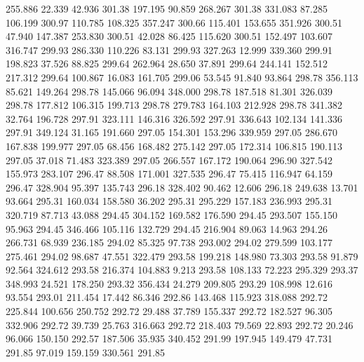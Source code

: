  255.886   22.339   42.936       301.38
 197.195   90.859  268.267       301.38
 331.083   87.285  106.199       300.97
 110.785  108.325  357.247       300.66
 115.401  153.655  351.926       300.51
  47.940  147.387  253.830       300.51
  42.028   86.425  115.620       300.51
 152.497  103.607  316.747       299.93
 286.330  110.226   83.131       299.93
 327.263   12.999  339.360       299.91
 198.823   37.526   88.825       299.64
 262.964   28.650   37.891       299.64
 244.141  152.512  217.312       299.64
 100.867   16.083  161.705       299.06
  53.545   91.840   93.864       298.78
 356.113   85.621  149.264       298.78
 145.066   96.094  348.000       298.78
 187.518   81.301  326.039       298.78
 177.812  106.315  199.713       298.78
 279.783  164.103  212.928       298.78
 341.382   32.764  196.728       297.91
 323.111  146.316  326.592       297.91
 336.643  102.134  141.336       297.91
 349.124   31.165  191.660       297.05
 154.301  153.296  339.959       297.05
 286.670  167.838  199.977       297.05
  68.456  168.482  275.142       297.05
 172.314  106.815  190.113       297.05
  37.018   71.483  323.389       297.05
 266.557  167.172  190.064       296.90
 327.542  155.973  283.107       296.47
  88.508  171.001  327.535       296.47
  75.415  116.947   64.159       296.47
 328.904   95.397  135.743       296.18
 328.402   90.462   12.606       296.18
 249.638   13.701   93.664       295.31
 160.034  158.580   36.202       295.31
 295.229  157.183  236.993       295.31
 320.719   87.713   43.088       294.45
 304.152  169.582  176.590       294.45
 293.507  155.150   95.963       294.45
 346.466  105.116  132.729       294.45
 216.904   89.063   14.963       294.26
 266.731   68.939  236.185       294.02
  85.325   97.738  293.002       294.02
 279.599  103.177  275.461       294.02
  98.687   47.551  322.479       293.58
 199.218  148.980   73.303       293.58
  91.879   92.564  324.612       293.58
 216.374  104.883    9.213       293.58
 108.133   72.223  295.329       293.37
 348.993   24.521  178.250       293.32
 356.434   24.279  209.805       293.29
 108.998   12.616   93.554       293.01
 211.454   17.442   86.346       292.86
 143.468  115.923  318.088       292.72
 225.844  100.656  250.752       292.72
  29.488   37.789  155.337       292.72
 182.527   96.305  332.906       292.72
  39.739   25.763  316.663       292.72
 218.403   79.569   22.893       292.72
  20.246   96.066  150.150       292.57
 187.506   35.935  340.452       291.99
 197.945  149.479   47.731       291.85
  97.019  159.159  330.561       291.85
